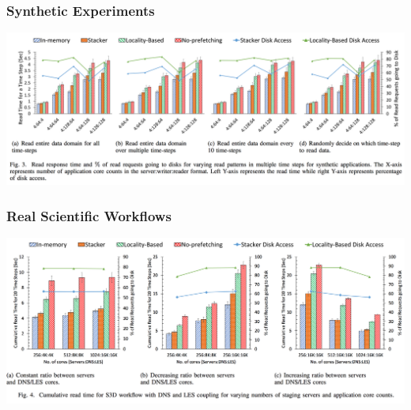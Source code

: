 \documentclass{beamer}
\begin{document}
\begin{frame}
\frametitle{Synthetic Experiments}
\begin{center}
        \includegraphics*[width=\textwidth]{images/stacker_fig_4.png}
\end{center}
\end{frame}
\begin{frame}
\frametitle{Real Scientific Workflows}
\begin{center}
        \includegraphics*[width=\textwidth]{images/stacker_fig_5.png}
\end{center}
\end{frame}






\end{document}
